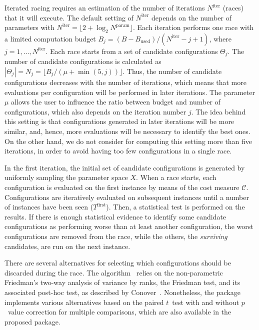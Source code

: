 \documentclass[article,a4paper,nojss,notitle]{jss}
\newcommand{\iter}{\ensuremath{j}\xspace}
\newcommand{\Budget}{\ensuremath{B}\xspace}
\newcommand{\Budgetj}{\ensuremath{\Budget_{\iter}}\xspace}
\newcommand{\Bused}{\ensuremath{\Budget_\text{used}}\xspace}
\newcommand{\Ncand}[1][]{\ensuremath{N_{#1}}\xspace}
\newcommand{\Nparam}{\ensuremath{{N^\text{param}}}\xspace}
\newcommand{\Niter}{\ensuremath{N^\text{iter}}\xspace}
\newcommand{\irace}{\pkg{irace}\xspace}
\newcommand{\FRACE}{\text{F-Race}\xspace}
\newcommand{\pvalue}{$p$~value\xspace}
\newcommand{\ttest}{$t$~test\xspace}
\begin{document}
Iterated racing requires an estimation of the number of iterations
$\Niter$ (races) that it will execute. The default setting of $\Niter$
depends on the number of parameters with $\Niter = \lfloor 2 +
\log_{2}\Nparam \rfloor$. Each iteration performs one race with a
limited computation budget $\Budgetj = (\Budget - \Bused) / (\Niter -
\iter + 1)$, where $\iter = 1, \dotsc, \Niter$. Each race starts from
a set of candidate configurations $\Theta_\iter$. The number of
candidate configurations is calculated as $|\Theta_\iter|=
\Ncand[\iter] = \lfloor \Budgetj / (\mu + \min(5,\iter))\rfloor$.
Thus, the number of candidate configurations decreases with the number
of iterations, which means that more evaluations per configuration
will be performed in later iterations. The parameter $\mu$ allows the
user to influence the ratio between budget and number of
configurations, which also depends on the iteration number
$\iter$. The idea behind this setting is that configurations generated in
later iterations will be more similar, and, hence, more evaluations
will be necessary to identify the best ones. On the other hand, we do
not consider for computing this setting more than five iterations, in
order to avoid having too few configurations in a single race.

\newcommand{\Tfirst}{\ensuremath{T^\text{first}}\xspace}
\newcommand{\Teach}{\ensuremath{T^\text{each}}\xspace}

In the first iteration, the initial set of candidate configurations is
generated by uniformly sampling the parameter space $X$. When a race
starts, each configuration is evaluated on the first instance by means
of the cost measure $\mathcal{C}$. Configurations are iteratively
evaluated on subsequent instances until a number of instances have
been seen ($\Tfirst$). Then, a statistical test is performed on the
results. If there is enough statistical evidence to identify some
candidate configurations as performing worse than at least another
configuration, the worst configurations are removed from the race,
while the others, the \emph{surviving} candidates, are run on the next
instance.

There are several alternatives for selecting which configurations
should be discarded during the race. The \FRACE
algorithm~\citep{BirStuPaqVar02:gecco,Birattari09tuning} relies on the
non-parametric Friedman's two-way analysis of variance by ranks, the
Friedman test, and its associated post-hoc test, as described by
Conover~\citep{Conover99:pns}. Nonetheless, the 
package~\citep{IRIDIA-2003-037} implements various alternatives based
on the paired \ttest with and without \pvalue correction for multiple
comparisons, which are also available in the proposed \irace
package.
\end{document}
